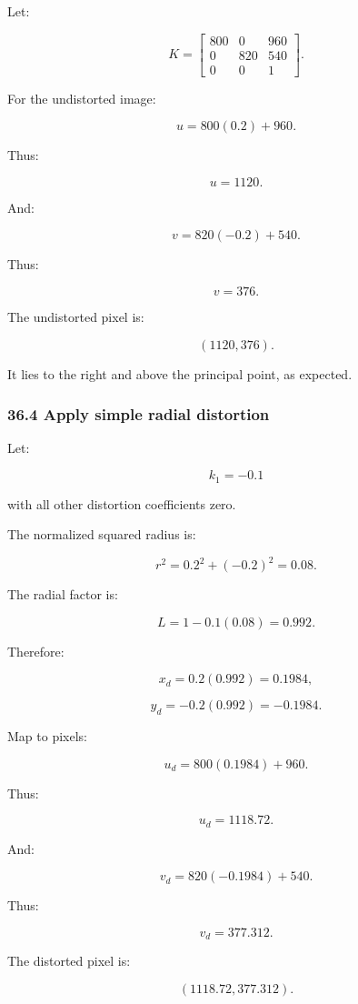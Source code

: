 Let:

\[
 K= \begin{bmatrix} 800&0&960\\ 0&820&540\\ 0&0&1 \end{bmatrix}.
\]

For the undistorted image:

\[
 u=800(0.2)+960.
\]

Thus:

\[
 \boxed{u=1120}.
\]

And:

\[
 v=820(-0.2)+540.
\]

Thus:

\[
 \boxed{v=376}.
\]

The undistorted pixel is:

\[
 \boxed{(1120,376)}.
\]

It lies to the right and above the principal point, as expected.

\subsubsection{36.4 Apply simple radial distortion}\label{02-foundations-ii-ch037-apply-simple-radial-distortion}

Let:

\[
 k_1=-0.1
\]

with all other distortion coefficients zero.

The normalized squared radius is:

\[
 r^2=0.2^2+(-0.2)^2=0.08.
\]

The radial factor is:

\[
 L=1-0.1(0.08)=0.992.
\]

Therefore:

\[
 x_d=0.2(0.992)=0.1984,
\]

\[
 y_d=-0.2(0.992)=-0.1984.
\]

Map to pixels:

\[
 u_d=800(0.1984)+960.
\]

Thus:

\[
 \boxed{u_d=1118.72}.
\]

And:

\[
 v_d=820(-0.1984)+540.
\]

Thus:

\[
 \boxed{v_d=377.312}.
\]

The distorted pixel is:

\[
 \boxed{(1118.72,377.312)}.
\]

